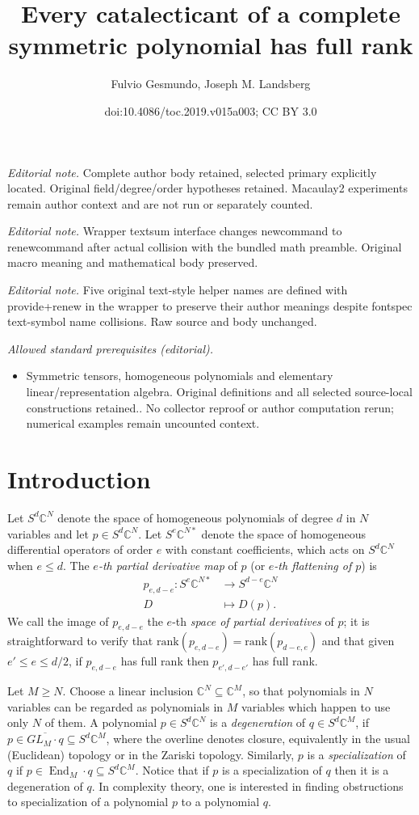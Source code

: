 \documentclass[11pt]{article}
\title{Every catalecticant of a complete symmetric polynomial has full rank}
\author{Fulvio Gesmundo, Joseph M. Landsberg}
\date{doi:10.4086/toc.2019.v015a003; CC BY 3.0}
\numberwithin{equation}{section}
\theoremstyle{definition}
\theoremstyle{plain}
\newcommand{\bbC}{\mathbb{C}}
\DeclareMathOperator{\End}{End}
\def\BC{\mathbb C}
\def\trank{\mathrm{rank}}
\begin{document}
\maketitle
\noindent\textit{Editorial note.} Complete author body retained, selected primary explicitly located. Original field/degree/order hypotheses retained. Macaulay2 experiments remain author context and are not run or separately counted.\par\medskip
\noindent\textit{Editorial note.} Wrapper textsum interface changes newcommand to renewcommand after actual collision with the bundled math preamble. Original macro meaning and mathematical body preserved.\par\medskip
\noindent\textit{Editorial note.} Five original text-style helper names are defined with provide+renew in the wrapper to preserve their author meanings despite fontspec text-symbol name collisions. Raw source and body unchanged.\par\medskip
\noindent\textit{Allowed standard prerequisites (editorial).}\begin{itemize}
\item Symmetric tensors, homogeneous polynomials and elementary linear/representation algebra. Original definitions and all selected source-local constructions retained.. No collector reproof or author computation rerun; numerical examples remain uncounted context.
\end{itemize}\medskip
\section{Introduction} 
 Let $S^d\BC^N$ denote the space of homogeneous polynomials of degree $d$ in $N$ variables and let $p\in S^d\BC^N$. Let $S^e\BC^{N*}$ denote the space of homogeneous differential operators of order $e$ with constant coefficients, which acts on $S^d\BC^N$ when $e\leq d$. The \emph{$e$-th partial derivative map}  of $p$  (or \emph{$e$-th flattening of $p$}) is
\begin{align} \label{flateqn}
p_{e,d-e}: S^e\BC^{N*}& \to S^{d-e}\BC^N\\
\nonumber D & \mapsto D(p).
\end{align}
 We call the image of $p_{e,d-e}$ the $e$-th \emph{space of partial derivatives} of $p$; it is straightforward to verify that $\trank (p_{e,d-e}) = \trank (p_{d-e,e})$ and that given $e' \leq e \leq d/2$, if $p_{e,d-e}$ has full rank then $p_{e',d-e'}$ has full rank.

Let $M\geq N$. Choose a linear inclusion $\bbC^N \subseteq \bbC^M$, so that polynomials in $N$ variables can be regarded as polynomials in $M$ variables which happen to use only $N$ of them. A polynomial $p\in S^d\BC^N$ is a \emph{degeneration} of $q\in S^d\BC^M$, if  $p\in \overline{GL_M\cdot q}\subseteq S^d\BC^M$, where the overline denotes closure, equivalently in the usual (Euclidean) topology or in the Zariski topology.  Similarly, $p$ is a \emph{specialization} of $q$ if $p \in \End_{M} \cdot q \subseteq S^d \bbC^M$. Notice that if $p$ is a specialization of $q$ then it is a degeneration of $q$. In complexity theory, one is interested in finding obstructions to specialization of a polynomial $p$ to a polynomial $q$.  
\end{document}
